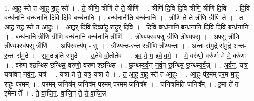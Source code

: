 \documentclass[17pt]{extarticle}
\begin{document}
1. आ॒हु स्ते॑ त आ॒हु रा॒हु स्ते᳚ । . ते॒ त्रीणि॒ त्रीणि॑ ते ते॒ त्रीणि॑ । . त्रीणि॑ दि॒वि दि॒वि त्रीणि॒ त्रीणि॑ दि॒वि । . दि॒वि बन्ध॑नानि॒ बन्ध॑नानि दि॒वि दि॒वि बन्ध॑नानि । . बन्ध॑ना॒नीति॒ बन्ध॑नानि । . त्रीणि॑ ते ते॒ त्रीणि॒ त्रीणि॑ ते । . त॒ आ॒हु॒ रा॒हु॒ स्ते॒ त॒ आ॒हुः॒ । . आ॒हु॒र् दि॒वि दि॒व्या॑हु राहुर् दि॒वि । . दि॒वि बन्ध॑नानि॒ बन्ध॑नानि दि॒वि दि॒वि बन्ध॑नानि । . बन्ध॑नानि॒ त्रीणि॒ त्रीणि॒ बन्ध॑नानि॒ बन्ध॑नानि॒ त्रीणि॑ । . त्रीण्य॒फ्स्व॑फ्सु त्रीणि॒ त्रीण्य॒फ्सु । . अ॒फ्सु त्रीणि॒ त्रीण्य॒फ्स्व॑फ्सु त्रीणि॑ । . अ॒फ्स्वित्य॑प् - सु । . त्रीण्य॒न्त-र॒न्त स्त्रीणि॒ त्रीण्य॒न्तः । . अ॒न्तः स॑मु॒द्रे स॑मु॒द्रे अ॒न्त-र॒न्तः स॑मु॒द्रे । . स॒मु॒द्र इति॑ समु॒द्रे । . उ॒तेवे॑ वो॒तोतेव॑ । . इ॒व॒ मे॒ म॒ इ॒वे॒ व॒मे॒ । . मे॒ वरु॑णो॒ वरु॑णो मे मे॒ वरु॑णः । . वरु॑ण श्छन्थ्सि छन्थ्सि॒ वरु॑णो॒ वरु॑ण श्छन्थ्सि । . छ॒न्थ्स्य॒र्व॒न् न॒र्व॒न् छ॒न्थ्सि॒ छ॒न्थ्स्य॒र्व॒न्न् । . अ॒र्व॒न्॒. यत्र॒ यत्रा᳚र्वन् नर्व॒न्॒. यत्र॑ । . यत्रा॑ ते ते॒ यत्र॒ यत्रा॑ ते । . त॒ आ॒हु रा॒हु स्ते॑ त आ॒हुः । . आ॒हुः प॑र॒मम् प॑र॒म मा॒हु रा॒हुः प॑र॒मम् । . प॒र॒मम् ज॒नित्र॑म् ज॒नित्र॑म् पर॒मम् प॑र॒मम् ज॒नित्र᳚म् । . ज॒नित्र॒मिति॑ ज॒नित्र᳚म् । . इ॒मा ते॑ त इ॒मेमा ते᳚ । . ते॒ वा॒जि॒न्॒. वा॒जि॒न् ते॒ ते॒ वा॒जि॒न्न् । \newline
\end{document}
